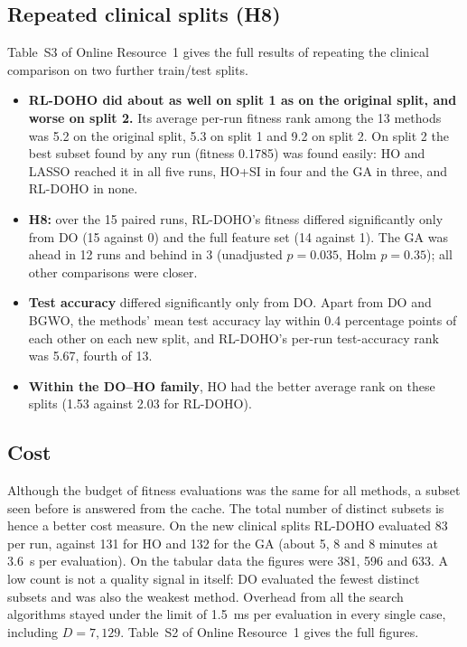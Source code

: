 \documentclass[pdflatex,sn-basic]{sn-jnl}
\begin{document}
\subsection{Repeated clinical splits (H8)}\label{sec:splits}
Table~S3 of Online Resource~1 gives the full results of repeating the clinical comparison on two further train/test splits.
\begin{itemize}
\item \textbf{RL-DOHO did about as well on split 1 as on the original split, and worse on split 2.} Its average per-run fitness rank among the 13 methods was 5.2 on the original split, 5.3 on split 1 and 9.2 on split 2. On split 2 the best subset found by any run (fitness 0.1785) was found easily: HO and LASSO reached it in all five runs, HO+SI in four and the GA in three, and RL-DOHO in none.
\item \textbf{H8:} over the 15 paired runs, RL-DOHO's fitness differed significantly only from DO (15 against 0) and the full feature set (14 against 1). The GA was ahead in 12 runs and behind in 3 (unadjusted $p=0.035$, Holm $p=0.35$); all other comparisons were closer.
\item \textbf{Test accuracy} differed significantly only from DO. Apart from DO and BGWO, the methods' mean test accuracy lay within 0.4 percentage points of each other on each new split, and RL-DOHO's per-run test-accuracy rank was 5.67, fourth of 13.
\item \textbf{Within the DO--HO family}, HO had the better average rank on these splits (1.53 against 2.03 for RL-DOHO).
\end{itemize}



\subsection{Cost}
Although the budget of fitness evaluations was the same for all methods, a subset seen before is answered from the cache. The total number of distinct subsets is hence a better cost measure. On the new clinical splits RL-DOHO evaluated 83 per run, against 131 for HO and 132 for the GA (about 5, 8 and 8 minutes at 3.6~s per evaluation). On the tabular data the figures were 381, 596 and 633. A low count is not a quality signal in itself: DO evaluated the fewest distinct subsets and was also the weakest method. Overhead from all the search algorithms stayed under the limit of 1.5~ms per evaluation in every single case, including $D=7{,}129$. Table~S2 of Online Resource~1 gives the full figures.
\end{document}
